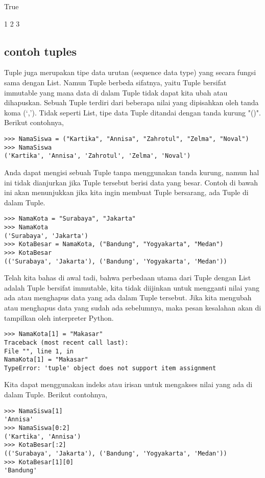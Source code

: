 True 

1
2
3
\subsection {contoh tuples}
Tuple juga merupakan tipe data urutan (sequence data type) yang secara fungsi sama dengan List. Namun Tuple berbeda sifatnya, yaitu Tuple bersifat immutable yang mana data di dalam Tuple tidak dapat kita ubah atau dihapuskan. Sebuah Tuple terdiri dari beberapa nilai yang dipisahkan oleh tanda koma (‘,’). Tidak seperti List, tipe data Tuple ditandai dengan tanda kurung "()". Berikut contohnya,
\begin{verbatim}
>>> NamaSiswa = ("Kartika", "Annisa", "Zahrotul", "Zelma", "Noval")
>>> NamaSiswa
('Kartika', 'Annisa', 'Zahrotul', 'Zelma', 'Noval')
\end{verbatim}

Anda dapat mengisi sebuah Tuple tanpa menggunakan tanda kurung, namun hal ini tidak dianjurkan jika Tuple tersebut berisi data yang besar. Contoh di bawah ini akan menunjukkan jika kita ingin membuat Tuple bersarang, ada Tuple di dalam Tuple.
\begin{verbatim}
>>> NamaKota = "Surabaya", "Jakarta"
>>> NamaKota
('Surabaya', 'Jakarta')
>>> KotaBesar = NamaKota, ("Bandung", "Yogyakarta", "Medan")
>>> KotaBesar
(('Surabaya', 'Jakarta'), ('Bandung', 'Yogyakarta', 'Medan'))
\end{verbatim}

Telah kita bahas di awal tadi, bahwa perbedaan utama dari Tuple dengan List adalah Tuple bersifat immutable, kita tidak diijinkan untuk mengganti nilai yang ada atau menghapus data yang ada dalam Tuple tersebut. Jika kita mengubah atau menghapus data yang sudah ada sebelumnya, maka pesan kesalahan akan di tampilkan oleh interpreter Python.
\begin{verbatim}
>>> NamaKota[1] = "Makasar"
Traceback (most recent call last):
File "", line 1, in
NamaKota[1] = "Makasar"
TypeError: 'tuple' object does not support item assignment
\end{verbatim}

Kita dapat menggunakan indeks atau irisan untuk mengakses nilai yang ada di dalam Tuple. Berikut contohnya,
\begin{verbatim}
>>> NamaSiswa[1]
'Annisa'
>>> NamaSiswa[0:2]
('Kartika', 'Annisa')
>>> KotaBesar[:2]
(('Surabaya', 'Jakarta'), ('Bandung', 'Yogyakarta', 'Medan'))
>>> KotaBesar[1][0]
'Bandung'
\end{verbatim}

